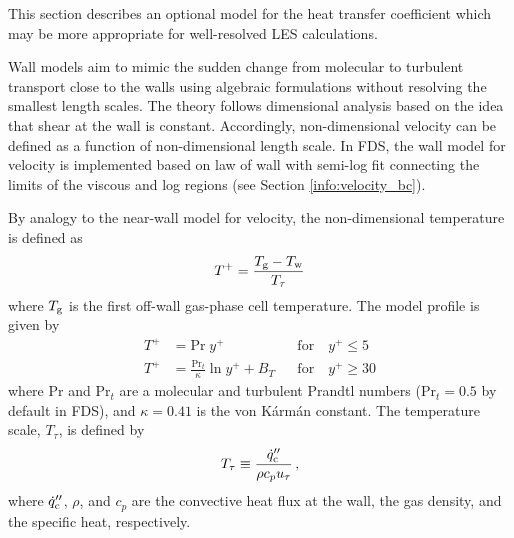 This section describes an optional model for the heat transfer coefficient which may be more appropriate for well-resolved LES calculations.

Wall models aim to mimic the sudden change from molecular to turbulent transport close to the walls using algebraic formulations without resolving the smallest length scales. The theory follows dimensional analysis based on the idea that shear at the wall is constant. Accordingly, non-dimensional velocity can be defined as a function of non-dimensional length scale. In FDS, the wall model for velocity is implemented based on law of wall with semi-log fit connecting the limits of the viscous and log regions (see Section \ref{info:velocity_bc}).

By analogy to the near-wall model for velocity, the non-dimensional temperature is defined as
\begin{equation}
T^+ = \frac{T_{\rm g} - T_{\rm w}}{T_\tau}
\end{equation}
where $T_{\rm g}$ is the first off-wall gas-phase cell temperature.  The model profile is given by
\begin{align}
\label{eqn_t_visclayer} T^+ &= \mbox{Pr}\;y^+                            && \mbox{for} \quad y^+ \le 5 \\
\label{eqn_t_loglaw}    T^+ &= \frac{\mbox{Pr}_t}{\kappa} \ln y^+ + B_T  && \mbox{for} \quad y^+ \ge 30
\end{align}
where Pr and Pr$_t$ are a molecular and turbulent Prandtl numbers  (Pr$_t=0.5$ by default in FDS), and $\kappa = 0.41$ is the von K\'arm\'an constant.  The temperature scale, $T_{\tau}$, is defined by
\begin{equation}
\label{eqn_friction_temperature}
T_{\tau} \equiv \frac{\dot{q}_{\rm c}''}{{\rho}{c_p}{u_{\tau}}} \,\mbox{,}
\end{equation}
where $\dot{q}_{\rm c}''$, $\rho$, and $c_p$ are the convective heat flux at the wall, the gas density, and the specific heat, respectively.

